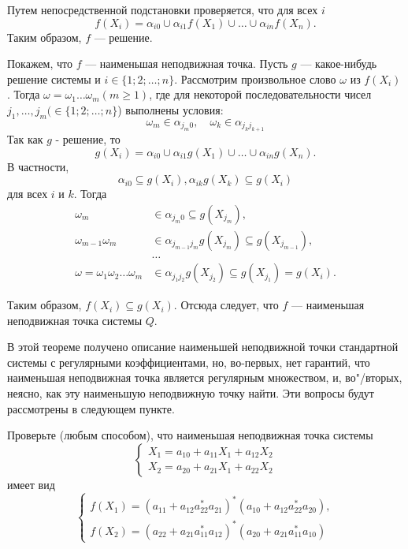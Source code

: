 \begin{myproof}
Путем непосредственной подстановки проверяется, что для всех $i$
\[
f(X_{i}) = \alpha_{i0} \cup \alpha_{i1}f(X_1) \cup \dots \cup \alpha_{in}f(X_n).
\]
Таким образом, $f$ --- решение.

Покажем, что $f$ --- наименьшая неподвижная точка. Пусть $g$ --- какое-нибудь решение системы и $i\in\{1;2;\ldots ;n\}$. Рассмотрим произвольное слово $\omega$ из $f(X_i)$. Тогда $\omega=\omega_1\ldots\omega_m (m\ge 1)$, где для некоторой последовательности чисел $j_1, \ldots , j_m (\in\{1;2;\ldots ;n\}$) выполнены условия:
\[
	\omega_m\in\alpha_{j_m0}, \quad \omega_k\in\alpha_{j_kj_{k+1}}
\]
Так как $g$ - решение, то
\[
	g(X_i) = \alpha_{i0} \cup \alpha_{i1}g(X_{1}) \cup \dots  \cup \alpha_{in}g(X_n).
\]
В частности,
\[
	\alpha_{i0} \subseteq g(X_i), 	\alpha_{ik}g(X_k) \subseteq g(X_i)
\]
для всех $i$ и $k$. Тогда
\begin{align*}
    \omega_m & \in \alpha_{j_m0} \subseteq g(X_{j_m}),\\
    \omega_{m-1}\omega_m & \in \alpha_{j_{m-1}j_m}g(X_{j_m})
        \subseteq g(X_{j_{m-1}}),\\
    &\ldots \\
    \omega=\omega_1\omega_2\ldots\omega_m & \in
        \alpha_{j_1j_2}g(X_{j_2}) \subseteq g(X_{j_1})=g(X_i).
\end{align*}

Таким образом, $f(X_i)\subseteq g(X_i)$. Отсюда следует, что $f$ --- наименьшая неподвижная точка системы $Q$.
\end{myproof}

В этой теореме получено описание наименьшей неподвижной точки стандартной системы с регулярными коэффициентами, но, во-первых, нет гарантий, что наименьшая неподвижная точка является регулярным множеством, и, во"/вторых, неясно, как эту наименьшую неподвижную точку найти. Эти вопросы будут рассмотрены в следующем пункте.

\begin{myproblem}
Проверьте (любым способом), что наименьшая неподвижная точка системы
\begin{equation}
\begin{cases}
X_1 = a_{10} + a_{11}X_1 + a_{12}X_2\\
X_2 = a_{20} + a_{21}X_1 + a_{22}X_2
\end{cases}
\end{equation}
имеет вид
\begin{equation}
\begin{cases}
f(X_1) = (a_{11}+a_{12}a^*_{22}a_{21})^*(a_{10}+a_{12}a^*_{22}a_{20}), \\
f(X_2) = (a_{22}+a_{21}a^*_{11}a_{12})^*(a_{20}+a_{21}a^*_{11}a_{10})
\end{cases}
\end{equation}
\end{myproblem}

